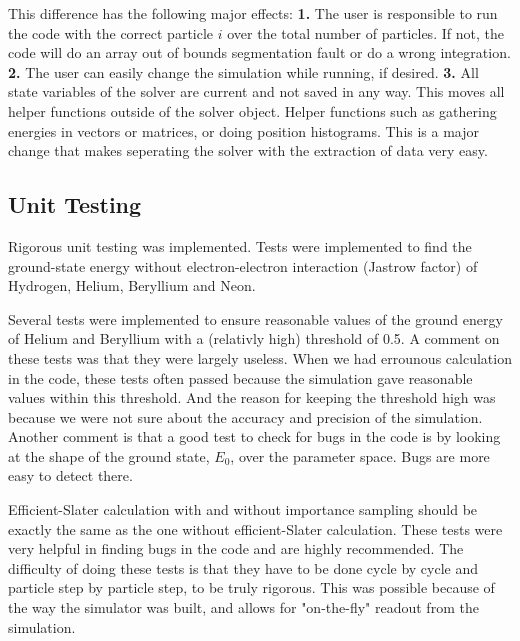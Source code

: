 \documentclass[twocolumns, a4paper,11pt,fleqn]{extarticle}
\begin{document}
This difference has the following major effects: 
{\color{MediumBlue}\bf1.} The user is responsible to run the code with the
correct particle $i$ over the total number of particles. If not, the code will
do an array out of bounds segmentation fault or do a wrong integration.
 {\color{MediumBlue}\bf2.} The user
can easily change the simulation while running, if desired. 
{\color{MediumBlue}\bf3.}
All state variables of the solver are current and not saved in any way. This moves
all helper functions outside of the solver object.
Helper functions such as gathering energies in vectors or matrices, 
or doing position histograms. This is a major change that makes seperating the solver
with the extraction of data very easy. 

\subsection{Unit Testing}
Rigorous unit testing was implemented. 
Tests were implemented to find the
ground-state energy without electron-electron interaction (Jastrow factor)
of Hydrogen, Helium, Beryllium and Neon.\newpage


\noindent Several tests were implemented to ensure reasonable values of the ground energy of Helium 
and Beryllium with a (relativly high) threshold of 0.5. A comment on these tests was
that they were largely useless. When we had errounous calculation in the code, these tests often passed
because the simulation gave reasonable values within this threshold. And the reason for keeping the threshold
high was because we were not sure about the accuracy and precision of the simulation. Another comment 
is that a good test to check for bugs in the code is by looking at the shape of the ground state, $E_0$, 
over the parameter space. Bugs are more easy to detect there.\\


\noindent Efficient-Slater calculation with and without importance sampling
should be exactly the same as the one without efficient-Slater calculation. These tests were very helpful
in finding bugs in the code and are highly recommended. The difficulty of doing these tests is that they have
to be done cycle by cycle and particle step by particle step, to be truly rigorous. This was possible because
of the way the simulator was built, and allows for "on-the-fly" readout from the simulation. 
\end{document}
